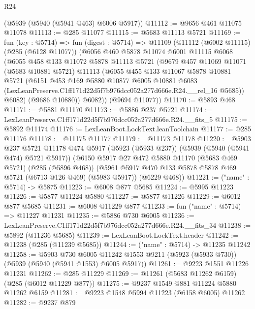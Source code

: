 \begin{lexlean}{R24}
\begin{coremodule}
    (@5939 (@5940 (@5941 @463) @6006 @5917))
@11112 := @9656 @461 @11075 @11078
@11113 := @285 @11077
@11115 := @5683 @11113 @5721
@11169 := fun (key : @5714) =>
  fun (digest : @5714) =>
  @11109
    (@11112
      (@6002 @11115)
      (@285 (@6128 @11077))
      (@6056
        @460
        @5878
        @11074
        @6001
        @11115
        @6068
        (@6055
          @458
          @133
          @11072
          @5878
          @11113
          @5721
          (@9679
            @457
            @11069
            @11071
            (@5683 @10881 @5721)
            @11113
            (@6055
              @455
              @133
              @11067
              @5878
              @10881
              @5721
              (@6151
                @453
                @169
                @5880
                @10877
                @6005
                @10881
                @6083
                (LexLeanPreserve.C1ff171d22d5f7b976dcc052a277d666e.R24.__rel_16 @5685))
              @6082)
            (@9686 @10880))
          @6082))
      (@9694 @11077))
@11170 := @5893 @468
@11171 := @5881 @11170
@11173 := @5886 @237 @5721
@11174 := LexLeanPreserve.C1ff171d22d5f7b976dcc052a277d666e.R24.__fits_5
@11175 := @5892 @11174
@11176 := LexLeanBoot.LockText.leanToolchain
@11177 := @285 @11176
@11178 := @11175 @11177
@11179 := @11173 @11178
@11220 := @5903
    @237
    @5721
    @11178
    @474
    @5917
    (@5923 (@5933 @237))
    (@5939 (@5940 (@5941 @474) @5721 @5917))
    (@6150
      @5917
      @27
      @472
      @5880
      @11170
      (@5683 @469 @5721)
      (@285 (@5896 @468))
      (@5961 @5917 @470 @133 @5878 @5878 @469 @5721 (@6713 @126 @469) (@5983 @5917))
      (@6229 @468))
@11221 := ("name" : @5714) -> @5875
@11223 := @6008 @877 @5685
@11224 := @5995 @11223
@11226 := @5877 @11224 @5880
@11227 := @5877 @11226
@11229 := @6012 @877 @5685
@11231 := @6008 @11229 @877
@11233 := fun ("name" : @5714) => @11227 @11231
@11235 := @5886 @730 @6005
@11236 := LexLeanPreserve.C1ff171d22d5f7b976dcc052a277d666e.R24.__fits_34
@11238 := @5892 (@11236 @5685)
@11239 := LexLeanBoot.LockText.header
@11242 := @11238 (@285 (@11239 @5685))
@11244 := ("name" : @5714) -> @11235 @11242
@11258 := @5903
    @730
    @6005
    @11242
    @1553
    @9211
    (@5923 (@5933 @730))
    (@5939 (@5940 (@5941 @1553) @6005 @5917))
@11261 := @9223 @1551 @11226 @11231
@11262 := @285 @11229
@11269 := @11261 (@5683 @11262 @6159) (@285 (@6012 @11229 @877))
@11275 := @9237 @1549 @881 @11224 @5880 @11262 @6159
@11281 := @9223 @1548 @5994 @11223 (@6158 @6005) @11262
@11282 := @9237 @879

\end{coremodule}
\end{lexlean}
